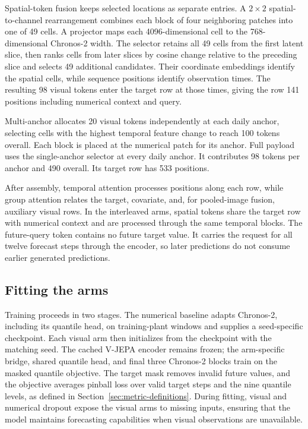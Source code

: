 Spatial-token fusion keeps selected locations as separate entries. A $2\times2$ spatial-to-channel rearrangement combines each block of four neighboring patches into one of 49 cells. A projector maps each 4096-dimensional cell to the 768-dimensional Chronos-2 width. The selector retains all 49 cells from the first latent slice, then ranks cells from later slices by cosine change relative to the preceding slice and selects 49 additional candidates. Their coordinate embeddings identify the spatial cells, while sequence positions identify observation times. The resulting 98 visual tokens enter the target row at those times, giving the row 141 positions including numerical context and query.

Multi-anchor allocates 20 visual tokens independently at each daily anchor, selecting cells with the highest temporal feature change to reach 100 tokens overall. Each block is placed at the numerical patch for its anchor. Full payload uses the single-anchor selector at every daily anchor. It contributes 98 tokens per anchor and 490 overall. Its target row has 533 positions.

After assembly, temporal attention processes positions along each row, while group attention relates the target, covariate, and, for pooled-image fusion, auxiliary visual rows. In the interleaved arms, spatial tokens share the target row with numerical context and are processed through the same temporal blocks. The future-query token contains no future target value. It carries the request for all twelve forecast steps through the encoder, so later predictions do not consume earlier generated predictions.

\subsection{Fitting the arms}

Training proceeds in two stages. The numerical baseline adapts Chronos-2, including its quantile head, on training-plant windows and supplies a seed-specific checkpoint. Each visual arm then initializes from the checkpoint with the matching seed. The cached V-JEPA encoder remains frozen; the arm-specific bridge, shared quantile head, and final three Chronos-2 blocks train on the masked quantile objective. The target mask removes invalid future values, and the objective averages pinball loss over valid target steps and the nine quantile levels, as defined in Section~\ref{sec:metric-definitions}. During fitting, visual and numerical dropout expose the visual arms to missing inputs, ensuring that the model maintains forecasting capabilities when visual observations are unavailable.

